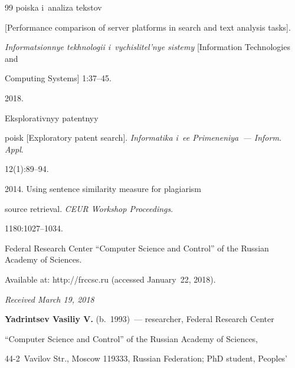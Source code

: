 {{\begin{thebibliography}{99}
poiska i~ana\-li\-za teks\-tov 

[Performance comparison of server platforms in search and text analysis tasks]. 

\textit{Informatsionnye tekhnologii i~vychislitel'nye sistemy} [Information Technologies and 

Computing Systems] 1:37--45.


 2018. 

Eksplorativnyy patentnyy 

poisk [Exploratory patent search]. \textit{Informatika i~ee Primeneniya~--- Inform. Appl}. 

12(1):89--94.



\pagebreak




 2014. Using sentence similarity measure for plagiarism 

source retrieval. \textit{CEUR Workshop Proceedings}. 

1180:1027--1034.


Federal Research Center ``Computer Science and Control'' of the Russian Academy of Sciences. 

Available at: {\sf http://frccsc.ru} (accessed January~22, 2018).

\end{thebibliography}

} }





\vspace*{-3pt}



\hfill{\small\textit{Received March 19, 2018}}         

     

\Contr



\noindent

\textbf{Yadrintsev Vasiliy  V.} (b.\ 1993)~--- researcher, Federal Research Center 

``Computer Science and Control'' of the Russian Academy of Sciences,  

44-2~Vavilov Str., Moscow 119333, Russian Federation; PhD student, Peoples' 

